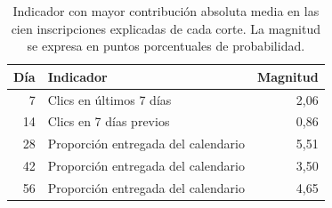 \begin{table}[!htbp]\centering
\caption{Indicador con mayor contribución absoluta media en las cien inscripciones explicadas de cada corte. La magnitud se expresa en puntos porcentuales de probabilidad.}\label{res:shap}
\begin{tabular}{rp{.65\linewidth}r}
\toprule
Día & Indicador & Magnitud\\
\midrule
7 & Clics en últimos 7 días & 2,06\\
14 & Clics en 7 días previos & 0,86\\
28 & Proporción entregada del calendario & 5,51\\
42 & Proporción entregada del calendario & 3,50\\
56 & Proporción entregada del calendario & 4,65\\
\bottomrule
\end{tabular}
\end{table}
